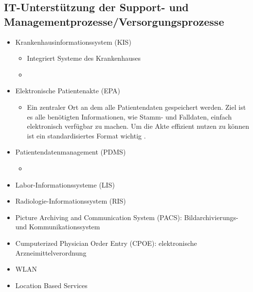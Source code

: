 	\subsection{IT-Unterstützung der Support- und Managementprozesse/Versorgungsprozesse}
	\parencite{oswald2019} \parencite[14]{braeutigam2017}
	\begin{itemize}
		\item Krankenhausinformationssystem (KIS)

		\begin{itemize}
			\item Integriert Systeme des Krankenhauses
			\item 
		\end{itemize}
		\item Elektronische Patientenakte (EPA)
		\begin{itemize}
			\item Ein zentraler Ort an dem alle Patientendaten gespeichert werden. Ziel ist es alle benötigten Informationen, wie Stamm- und Falldaten, einfach elektronisch verfügbar zu machen. Um die Akte effizient nutzen zu können ist ein standardisiertes Format wichtig \parencite[62]{oswald2019}.
		\end{itemize}
		\item Patientendatenmanagement (PDMS)
		\begin{itemize}
			\item 
		\end{itemize}
		\item Labor-Informationssysteme (LIS)
		\item Radiologie-Informationssystem (RIS)
		\item Picture Archiving and Communication System (PACS): Bildarchivierungs- und Kommunikationssystem
		\item Cumputerized Physician Order Entry (CPOE): elektronische Arzneimittelverordnung
		\item WLAN
		\item Location Based Services \parencite{mci/Leimeister2006}
	\end{itemize}
